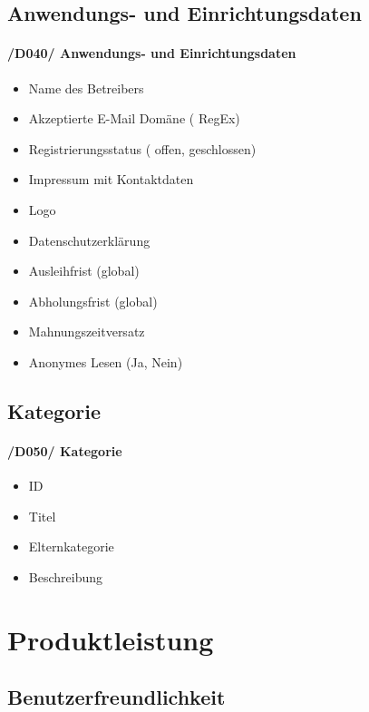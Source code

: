 \documentclass{article}
\begin{document}

	\subsection{Anwendungs- und Einrichtungsdaten}
	\label{D040} \paragraph{/D040/ Anwendungs- und Einrichtungsdaten}
	\begin{itemize}
		\item Name des Betreibers
		\item Akzeptierte E-Mail Domäne ( RegEx)
		\item Registrierungsstatus ( offen, geschlossen)
		\item Impressum mit Kontaktdaten
		\item Logo
		\item Datenschutzerklärung
		\item Ausleihfrist (global)
        \item Abholungsfrist (global)
        \item Mahnungszeitversatz
        \item Anonymes Lesen (Ja, Nein)
        
	\end{itemize}
	
\subsection{Kategorie}
	\label{D050} \paragraph{/D050/ Kategorie}
	\begin{itemize}
	\item ID
	\item Titel
	\item Elternkategorie
	\item Beschreibung
	\end{itemize}	
	
\newpage



\section{Produktleistung}

\subsection{Benutzerfreundlichkeit}
\end{document}

